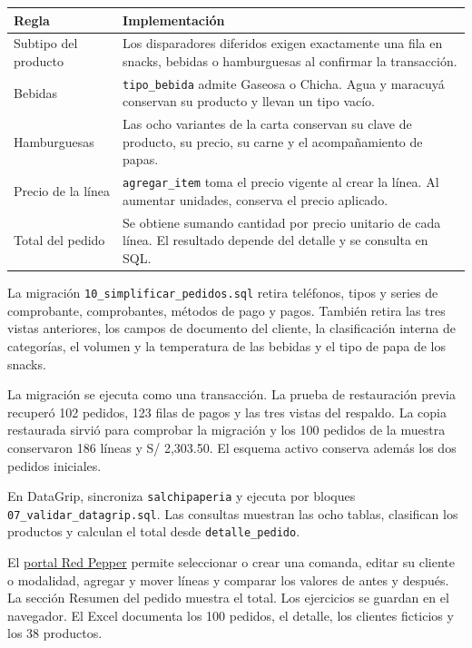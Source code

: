 \documentclass[11pt,a4paper]{article}
\newcommand{\codigo}[1]{\texttt{#1}}
\newcommand{\seccion}[2]{\vspace{5pt}{\Large\bfseries #1\enspace #2}\par\vspace{2pt}}
\begin{document}
\begin{tabularx}{\linewidth}{@{}lY@{}}
\toprule
\textbf{Regla} & \textbf{Implementación}\\
\midrule
Subtipo del producto & Los disparadores diferidos exigen exactamente una fila en snacks, bebidas o hamburguesas al confirmar la transacción.\\
Bebidas & \codigo{tipo\_bebida} admite Gaseosa o Chicha. Agua y maracuyá conservan su producto y llevan un tipo vacío.\\
Hamburguesas & Las ocho variantes de la carta conservan su clave de producto, su precio, su carne y el acompañamiento de papas.\\
Precio de la línea & \codigo{agregar\_item} toma el precio vigente al crear la línea. Al aumentar unidades, conserva el precio aplicado.\\
Total del pedido & Se obtiene sumando cantidad por precio unitario de cada línea. El resultado depende del detalle y se consulta en SQL.\\
\bottomrule
\end{tabularx}

\seccion{4.}{Migración del esquema}
La migración \codigo{10\_simplificar\_pedidos.sql} retira teléfonos, tipos y series de comprobante, comprobantes, métodos de pago y pagos. También retira las tres vistas anteriores, los campos de documento del cliente, la clasificación interna de categorías, el volumen y la temperatura de las bebidas y el tipo de papa de los snacks.

La migración se ejecuta como una transacción. La prueba de restauración previa recuperó 102 pedidos, 123 filas de pagos y las tres vistas del respaldo. La copia restaurada sirvió para comprobar la migración y los 100 pedidos de la muestra conservaron 186 líneas y S/ 2,303.50. El esquema activo conserva además los dos pedidos iniciales.

\seccion{5.}{Práctica y verificación}
En DataGrip, sincroniza \codigo{salchipaperia} y ejecuta por bloques \codigo{07\_validar\_datagrip.sql}. Las consultas muestran las ocho tablas, clasifican los productos y calculan el total desde \codigo{detalle\_pedido}.

El \href{https://nexlabsgroup.com/basededatos/}{portal Red Pepper} permite seleccionar o crear una comanda, editar su cliente o modalidad, agregar y mover líneas y comparar los valores de antes y después. La sección Resumen del pedido muestra el total. Los ejercicios se guardan en el navegador. El Excel documenta los 100 pedidos, el detalle, los clientes ficticios y los 38 productos.
\end{document}
